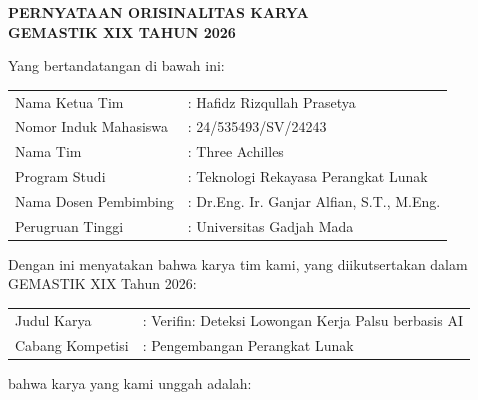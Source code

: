 \documentclass[10pt]{article}
\begin{document}
\begin{center}
{\fontsize{13}{15}\selectfont\bfseries
PERNYATAAN ORISINALITAS KARYA\\
GEMASTIK XIX TAHUN 2026}
\end{center}

\vspace{0.8em}

Yang bertandatangan di bawah ini:

\vspace{0.3em}

\begin{tabularx}{\textwidth}{@{}p{4.2cm}l@{}}
Nama Ketua Tim & : Hafidz Rizqullah Prasetya \\[3pt]
Nomor Induk Mahasiswa & : 24/535493/SV/24243 \\[3pt]
Nama Tim & : Three Achilles \\[3pt]
Program Studi & : Teknologi Rekayasa Perangkat Lunak \\[3pt]
Nama Dosen Pembimbing & : Dr.Eng. Ir. Ganjar Alfian, S.T., M.Eng. \\[3pt]
Perugruan Tinggi & : Universitas Gadjah Mada \\
\end{tabularx}

\vspace{0.5em}

Dengan ini menyatakan bahwa karya tim kami, yang diikutsertakan dalam GEMASTIK XIX Tahun 2026:

\vspace{0.3em}

\begin{tabularx}{\textwidth}{@{}p{4.2cm}l@{}}
Judul Karya & : Verifin: Deteksi Lowongan Kerja Palsu berbasis AI \\[3pt]
Cabang Kompetisi & : Pengembangan Perangkat Lunak \\
\end{tabularx}

\vspace{0.5em}

bahwa karya yang kami unggah adalah:

\vspace{0.3em}
\end{document}
